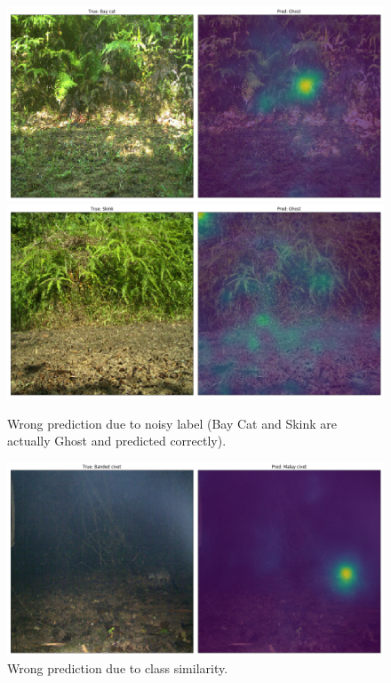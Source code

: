 \documentclass[journal, a4paper]{IEEEtran}
\begin{document}
	\begin{figure}[!hbt]
		\begin{center}
		\includegraphics[width=\columnwidth]{images/No_Animal_wrong.png}
		\includegraphics[width=\columnwidth]{images/No_Animal_wrong3.png}
		\caption{Wrong prediction due to noisy label (Bay Cat and Skink are actually Ghost and predicted correctly).}
		\label{fig:noisy}
		\end{center}
	\end{figure}
	\begin{figure}[!hbt]
		\begin{center}
		\includegraphics[width=\columnwidth]{images/mismatch.png}
		\caption{Wrong prediction due to class similarity.}
		\label{fig:mismatch}
		\end{center}
	\end{figure}
\end{document}
